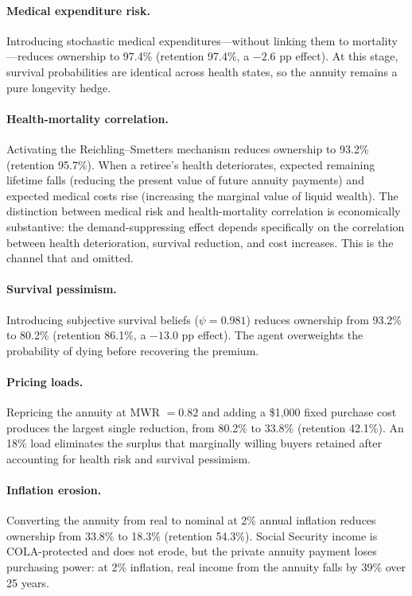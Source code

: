 \documentclass[12pt]{article}
\begin{document}
\paragraph{Medical expenditure risk.} Introducing stochastic medical expenditures---without linking them to mortality---reduces ownership to 97.4\% (retention 97.4\%, a $-2.6$ pp effect). At this stage, survival probabilities are identical across health states, so the annuity remains a pure longevity hedge.

\paragraph{Health-mortality correlation.} Activating the Reichling--Smetters mechanism reduces ownership to 93.2\% (retention 95.7\%). When a retiree's health deteriorates, expected remaining lifetime falls (reducing the present value of future annuity payments) and expected medical costs rise (increasing the marginal value of liquid wealth). The distinction between medical risk and health-mortality correlation is economically substantive: the demand-suppressing effect depends specifically on the correlation between health deterioration, survival reduction, and cost increases. This is the channel that \citet{pashchenko2013} and \citet{peijnenburg2016} omitted.

\paragraph{Survival pessimism.} Introducing subjective survival beliefs ($\psi = 0.981$) reduces ownership from 93.2\% to 80.2\% (retention 86.1\%, a $-13.0$ pp effect). The agent overweights the probability of dying before recovering the premium.

\paragraph{Pricing loads.} Repricing the annuity at MWR $= 0.82$ and adding a \$1,000 fixed purchase cost produces the largest single reduction, from 80.2\% to 33.8\% (retention 42.1\%). An 18\% load eliminates the surplus that marginally willing buyers retained after accounting for health risk and survival pessimism.

\paragraph{Inflation erosion.} Converting the annuity from real to nominal at 2\% annual inflation reduces ownership from 33.8\% to 18.3\% (retention 54.3\%). Social Security income is COLA-protected and does not erode, but the private annuity payment loses purchasing power: at 2\% inflation, real income from the annuity falls by 39\% over 25 years.
\end{document}
